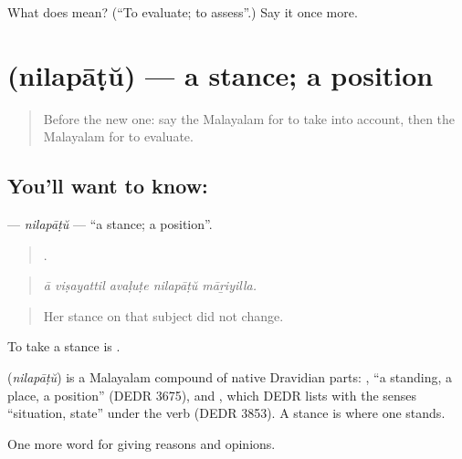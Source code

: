 \begin{tcolorbox}[breakable,colback=teal!4,colframe=teal!35!black,title={Before you move on}]
What does  mean? (\textquotedblleft{}To evaluate; to assess\textquotedblright{}.) Say it once more.
\end{tcolorbox}
\section[\texorpdfstring{\ml{നിലപാട്} (nilapāṭŭ)}{നിലപാട് (nilapāṭŭ)}]{ (nilapāṭŭ) — a stance; a position}

\label{lesson:ML-C408-nilapatu}



\begin{quote}
Before the new one: say the Malayalam for to take into account, then the Malayalam for to evaluate.
\end{quote}

\subsection*{You'll want to know: }
\textbf{} — \emph{nilapāṭŭ} — \textquotedblleft{}a stance; a position\textquotedblright{}.

\begin{quote}
    .
\end{quote}

\begin{quote}
\emph{ā viṣayattil avaḷuṭe nilapāṭŭ māṟiyilla.}
\end{quote}

\begin{quote}
Her stance on that subject did not change.
\end{quote}

To take a stance is  .

\begin{cousinweb}
\textbf{} (\emph{nilapāṭŭ}) is a Malayalam compound of native Dravidian parts: , \textquotedblleft{}a standing, a place, a position\textquotedblright{} (DEDR 3675), and , which DEDR lists with the senses \textquotedblleft{}situation, state\textquotedblright{} under the verb  (DEDR 3853). A stance is where one stands.
\end{cousinweb}

\begin{grammarlens}[title={What you've built}]
One more word for giving reasons and opinions.
\end{grammarlens}

